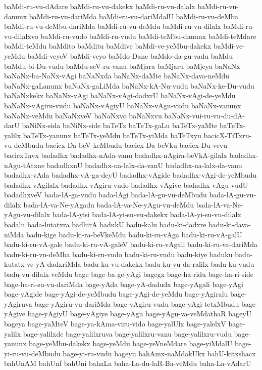 {baMdi-ru-vu-dAdare
baMdi-ru-vu-dakekx
baMdi-ru-vu-dalalx
baMdi-ru-vu-danunx
baMdi-ru-vu-dariMda
baMdi-ru-vu-dariMdalU
baMdi-ru-vu-deMba
baMdi-ru-vu-deMbu-dariMda
baMdi-ru-vu-deMdu
baMdi-ru-vu-dilalx
baMdi-ru-vu-dilalxvo
baMdi-ru-vudo
baMdi-ru-vudu
baMdi-teMbu-danunx
baMdi-teMdare
baMdi-teMdu
baMdito
baMditu
baMdive
baMdi-ve-yeMbu-dakekx
baMdi-ve-yeMdu
baMdi-veyeV
baMdi-veyo
baMdo-Dane
baMdo-da-gu-vadu
baMdu
baMdu-bi-Du-vudu
baMdu-seV-ru-vanu
baMjara
baMjaru
baMjeya
baNaNx
baNaNx-ba-NaNx-vAgi
baNaNxda
baNaNx-daMte
baNaNx-dava-neMdu
baNaNx-gaLanunx
baNaNx-gaLiMda
baNaNx-kA-Nu-vudu
baNaNx-ke-Du-vudu
baNaNxkekx
baNaNx-vAgi
baNaNx-vAgi-dadxrU
baNaNx-vAgi-de-yeMdu
baNaNx-vAgiru-vudu
baNaNx-vAgiyU
baNaNx-vAgu-vudu
baNaNx-vanunx
baNaNx-veMdu
baNaNxveV
baNaNxvo
baNaNxvu
baNaNx-vui-ru-vu-du-dA-darU
baNiNx-sida
baNiNx-side
baTeTx
baTeTx-gaLu
baTeTx-yaMte
baTeTx-yalilx
baTeTx-yanunx
baTeTx-yeMdu
baTeTx-yiMda
baTeTxyu
bacicX-TiTxru-vu-deMbudu
bacicx-Da-beV-keMbudu
bacicx-Da-beVku
bacicx-Du-vevu
bacicxTavx
badadhx
badadhx-nAda-vanu
badadhx-nAgira-beVkA-gilalx
badadhx-nAgu-tAtxne
badadhxnU
badadhx-na-lalx-da-vanU
badadhx-na-lalx-da-vanu
badadhx-vAda
badadhx-vA-ga-deyU
badadhx-vAgide
badadhx-vAgi-de-yeMbudu
badadhx-vAgilalx
badadhx-vAgiru-vudo
badadhx-vAgive
badadhx-vAgu-vudU
badadhxveV
bada-lA-ga-vudu
bada-lAgi
bada-lA-gu-vu-deMbudu
bada-lA-gu-vu-dilalx
bada-lA-va-Ne-yAgadu
bada-lA-va-Ne-yAgu-vu-deMdu
bada-lA-va-Ne-yAgu-vu-dilalx
bada-lA-yisi
bada-lA-yi-su-vu-dakekx
bada-lA-yi-su-vu-dilalx
badalu
bada-lutatxra
badhirA
badukU
badu-kalu
badu-ki-dadxre
badu-ki-dava-niMda
badu-kige
badu-ki-ra-beVkeMdu
badu-ki-ru-vAga
badu-ki-ru-vA-galU
badu-ki-ru-vA-gale
badu-ki-ru-vA-galeV
badu-ki-ru-vAgali
badu-ki-ru-va-dariMda
badu-ki-ru-vu-deMba
badu-ki-ru-vudo
badu-ki-ru-vudu
badu-kiye
baduku
badu-kutatx-ve-yA-dadxriMda
badu-ku-vu-dakekx
badu-ku-vu-da-ralilx
badu-ku-vudu
badu-vu-dilalx-veMdu
bage
bage-ba-ge-yAgi
bagegx
bage-ha-ridu
bage-ha-ri-side
bage-ha-ri-su-vu-dariMda
bage-yAda
bage-yA-dadudx
bage-yAgali
bage-yAgi
bage-yAgide
bage-yAgi-de-yeMbudu
bage-yAgi-de-yeMdu
bage-yAgiralu
bage-yAgiruva
bage-yAgiru-vu-dariMda
bage-yAgiru-vudu
bage-yAgi-tetxMbudu
bage-yAgive
bage-yAgiyU
bage-yAgiye
bage-yAgu
bage-yAgu-va-veMdathaR
bageyU
bageya
bage-yaMteV
bage-ya-kAma-viru-vido
bage-yalUlx
bage-yalelxV
bage-yalilx
bage-yalilxde
bage-yalilxruva
bage-yalilxru-vanu
bage-yalilxru-vudu
bage-yanunx
bage-yeMbu-dakekx
bage-yeMdu
bage-yeVneMdare
bage-yiMdalU
bage-yi-ru-vu-deMbudu
bage-yi-ru-vudu
bageyu
bahAmx-naMdakUkx
bahU-kitxshacx
bahUnAM
bahUnf
bahUni
bahaLa
baha-La-du-laR-Ba-veMdu
baha-La-vAdarU
}
